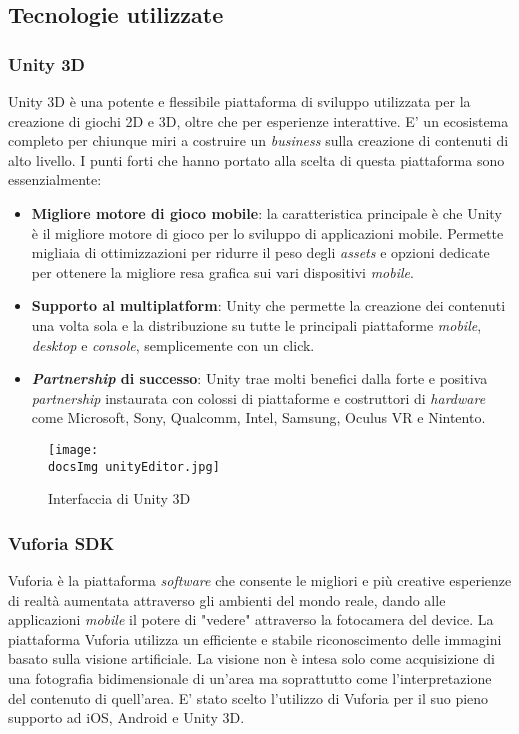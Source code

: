 \subsection{Tecnologie utilizzate}
\subsubsection{Unity 3D}
Unity 3D \`e una potente e flessibile piattaforma di sviluppo utilizzata per la creazione di giochi 2D e 3D, oltre che per esperienze interattive. E' un ecosistema completo per chiunque miri a costruire un \textit{business\gloss} sulla creazione di contenuti di alto livello. I punti forti che hanno portato alla scelta di questa piattaforma sono essenzialmente:
\begin{itemize}
	\item \textbf{Migliore motore di gioco mobile}: la caratteristica principale \`e che Unity \`e il migliore motore di gioco per lo sviluppo di applicazioni mobile. Permette migliaia di ottimizzazioni per ridurre il peso degli \textit{assets\gloss} e opzioni dedicate per ottenere la migliore resa grafica sui vari dispositivi \textit{mobile}.
	\item \textbf{Supporto al multiplatform}: Unity che permette la creazione dei contenuti una volta sola e la distribuzione su tutte le principali piattaforme \textit{mobile}, \textit{desktop} e \textit{console}, semplicemente con un click.
	\item \textbf{\textit{Partnership} di successo}: Unity trae molti benefici dalla forte e positiva \textit{partnership} instaurata con colossi di piattaforme e costruttori di \textit{hardware} come Microsoft, Sony, Qualcomm, Intel, Samsung, Oculus VR e Nintento.
\end{itemize}  

\begin{figure}[H]
	\centering
	\texttt{[image: \\docsImg unityEditor.jpg]}
	\caption{Interfaccia di Unity 3D}
	\label{fig: Interfaccia di Unity 3D}
\end{figure}

\subsubsection{Vuforia SDK}
Vuforia è la piattaforma \textit{software\gloss} che consente le migliori e più creative esperienze di realtà aumentata attraverso gli ambienti del mondo reale, dando alle applicazioni \textit{mobile} il potere di "vedere" attraverso la fotocamera del device.
La piattaforma Vuforia utilizza un efficiente e stabile riconoscimento delle immagini basato sulla visione artificiale. La visione non \`e intesa solo come acquisizione di una fotografia bidimensionale di un'area ma soprattutto come l'interpretazione del contenuto di quell'area.
E' stato scelto l'utilizzo di Vuforia per il suo pieno supporto ad iOS, Android e Unity 3D.
\\

